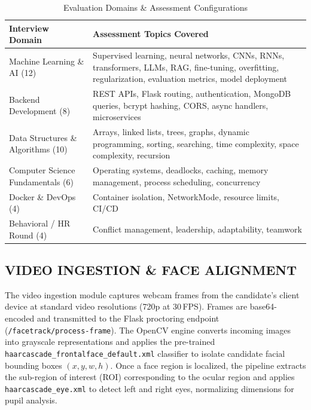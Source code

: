 \documentclass[12pt,a4paper]{report}
\begin{document}
\begin{table}[htbp]
  \centering
  \caption{Evaluation Domains \& Assessment Configurations}
  \label{tab:domains}
  \renewcommand{\arraystretch}{1.3}
  \begin{tabular}{p{4cm} p{9cm}}
    \toprule
    \textbf{Interview Domain} & \textbf{Assessment Topics Covered} \\
    \midrule
    Machine Learning \& AI (12) &
      Supervised learning, neural networks, CNNs, RNNs, transformers,
      LLMs, RAG, fine-tuning, overfitting, regularization, evaluation
      metrics, model deployment \\
    \addlinespace
    Backend Development (8) &
      REST APIs, Flask routing, authentication, MongoDB queries,
      bcrypt hashing, CORS, async handlers, microservices \\
    \addlinespace
    Data Structures \& Algorithms (10) &
      Arrays, linked lists, trees, graphs, dynamic programming,
      sorting, searching, time complexity, space complexity, recursion \\
    \addlinespace
    Computer Science Fundamentals (6) &
      Operating systems, deadlocks, caching, memory management,
      process scheduling, concurrency \\
    \addlinespace
    Docker \& DevOps (4) &
      Container isolation, NetworkMode, resource limits, CI/CD \\
    \addlinespace
    Behavioral / HR Round (4) &
      Conflict management, leadership, adaptability, teamwork \\
    \bottomrule
  \end{tabular}
\end{table}

\subsection{VIDEO INGESTION \& FACE ALIGNMENT}

The video ingestion module captures webcam frames from the candidate's client device at
standard video resolutions (720p at 30\,FPS). Frames are base64-encoded and transmitted
to the Flask proctoring endpoint (\texttt{/facetrack/process-frame}). The OpenCV engine
converts incoming images into grayscale representations and applies the pre-trained
\texttt{haarcascade\_frontalface\_default.xml} classifier to isolate candidate facial
bounding boxes $(x, y, w, h)$. Once a face region is localized, the pipeline extracts the
sub-region of interest (ROI) corresponding to the ocular region and applies
\texttt{haarcascade\_eye.xml} to detect left and right eyes, normalizing dimensions for
pupil analysis.
\end{document}
